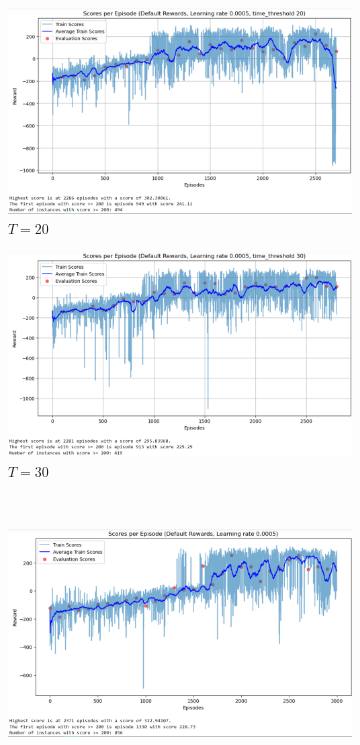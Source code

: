 \documentclass[a4paper, 11pt]{article}
\begin{document}
	\begin{figure}[ht]
		\begin{center}
			\begin{subfigure}{0.48\textwidth}
				\includegraphics[width=\linewidth]{data_policygradient/7timethreshold20run.PNG}
				\caption{$T=20$}
				\label{fig:pg_t20}
			\end{subfigure}\hfill 
			\begin{subfigure}{0.48\textwidth}
				\includegraphics[width=\linewidth]{data_policygradient/6timethreshold30run.PNG}
				\caption{$T=30$}
				\label{fig:pg_t30}
			\end{subfigure}\\
			\begin{subfigure}{0.48\textwidth}
				\includegraphics[width=\linewidth]{data_policygradient/2learningrate0005run.PNG}

\end{subfigure}
\end{center}
\end{figure}
\end{document}

